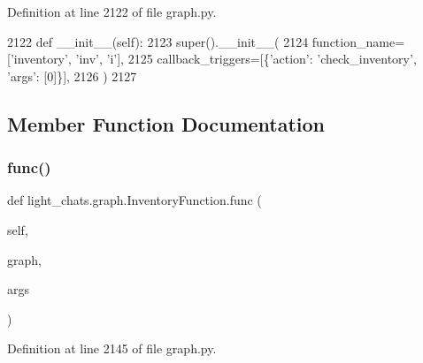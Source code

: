 Definition at line 2122 of file graph.\+py.


\begin{DoxyCode}
2122     \textcolor{keyword}{def }\_\_init\_\_(self):
2123         super().\_\_init\_\_(
2124             function\_name=[\textcolor{stringliteral}{'inventory'}, \textcolor{stringliteral}{'inv'}, \textcolor{stringliteral}{'i'}],
2125             callback\_triggers=[\{\textcolor{stringliteral}{'action'}: \textcolor{stringliteral}{'check\_inventory'}, \textcolor{stringliteral}{'args'}: [0]\}],
2126         )
2127 
\end{DoxyCode}


\subsection{Member Function Documentation}
\mbox{\label{classlight__chats_1_1graph_1_1InventoryFunction_ae1d63ccf80bca5e20060ca5ffb8a684a}} 
\subsubsection{\texorpdfstring{func()}{func()}}
{\footnotesize\ttfamily def light\+\_\+chats.\+graph.\+Inventory\+Function.\+func (\begin{DoxyParamCaption}\item[{}]{self,  }\item[{}]{graph,  }\item[{}]{args }\end{DoxyParamCaption})}



Definition at line 2145 of file graph.\+py.


